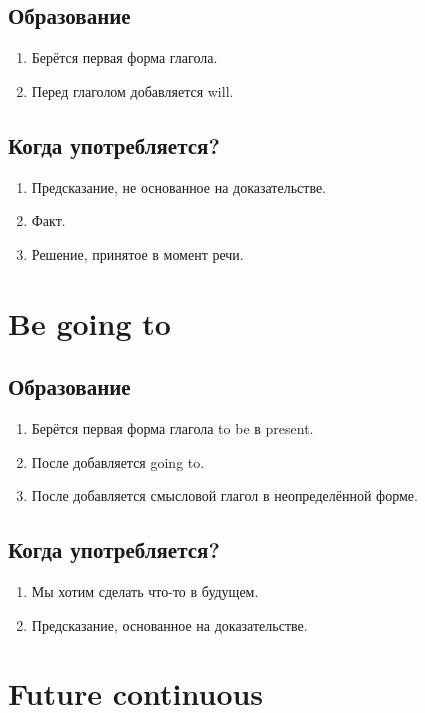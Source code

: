 \documentclass[oneside]{book}
\begin{document}
    \subsection{Образование}
    \begin{enumerate}
        \item Берётся первая форма глагола.
        \item Перед глаголом добавляется will.
    \end{enumerate}

    \subsection{Когда употребляется?}
    \begin{enumerate}
        \item Предсказание, не основанное на доказательстве.
        \item Факт.
        \item Решение, принятое в момент речи.
    \end{enumerate}

    \section{Be going to}
    \subsection{Образование}
    \begin{enumerate}
        \item Берётся первая форма глагола to be в present.
        \item После добавляется going to.
        \item После добавляется смысловой глагол в неопределённой форме.
    \end{enumerate}

    \subsection{Когда употребляется?}
    \begin{enumerate}
        \item Мы хотим сделать что-то в будущем.
        \item Предсказание, основанное на доказательстве.
    \end{enumerate}

    \section{Future continuous}
\end{document}
